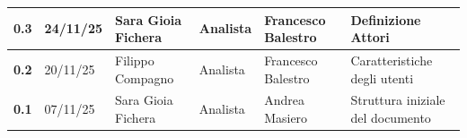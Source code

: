 \documentclass[a4paper,12pt]{article}
\begin{document}
{\begin{table}[h!]
\begin{tabularx}{\textwidth}{|l|l|l|l|L|L|}
                \hline
                \textbf{0.3} & 24/11/25 & Sara Gioia Fichera & Analista & Francesco Balestro &  Definizione Attori \\
                \hline
                \textbf{0.2} & 20/11/25 & Filippo Compagno & Analista & Francesco Balestro & Caratteristiche degli utenti \\
                \hline
                \textbf{0.1} & 07/11/25 & Sara Gioia Fichera & Analista & Andrea Masiero & Struttura iniziale del documento \\
                \hline
            \end{tabularx}
        \end{table}
    }
    \newpage
    
    \tableofcontents
    \newpage

    \listoffigures
    \newpage
    
    \listoftables
    \newpage
\end{document}
